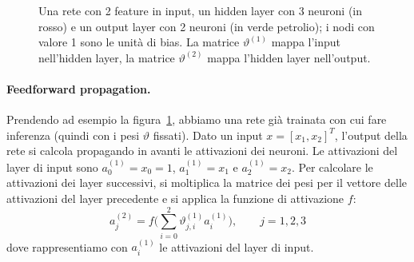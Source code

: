 \begin{figure}[htbp]
\centering
{}
\caption{Una rete con 2 feature in input, un hidden layer con 3 neuroni (in rosso) e un output layer con 2 neuroni (in verde petrolio); i nodi con valore 1 sono le unità di bias. La matrice $\vartheta^{(1)}$ mappa l'input nell'hidden layer, la matrice $\vartheta^{(2)}$ mappa l'hidden layer nell'output.}
\label{fig:rete-esempio}
\end{figure}

\paragraph{Feedforward propagation.}
Prendendo ad esempio la figura~\ref{fig:rete-esempio}, abbiamo una rete già trainata con cui fare inferenza (quindi con i pesi $\vartheta$ fissati). Dato un input $x = [x_1, x_2]^T$, l'output della rete si calcola propagando in avanti le attivazioni dei neuroni. Le attivazioni del layer di input sono $a_0^{(1)} = x_0 = 1$, $a_1^{(1)} = x_1$ e $a_2^{(1)} = x_2$. Per calcolare le attivazioni dei layer successivi, si moltiplica la matrice dei pesi per il vettore delle attivazioni del layer precedente e si applica la funzione di attivazione $f$:
\[
  a_j^{(2)} = f\Big(\sum_{i=0}^2 \vartheta_{j, i}^{(1)} a_i^{(1)}\Big), \qquad j = 1, 2, 3
\]
dove rappresentiamo con $a_i^{(1)}$ le attivazioni del layer di input. 

